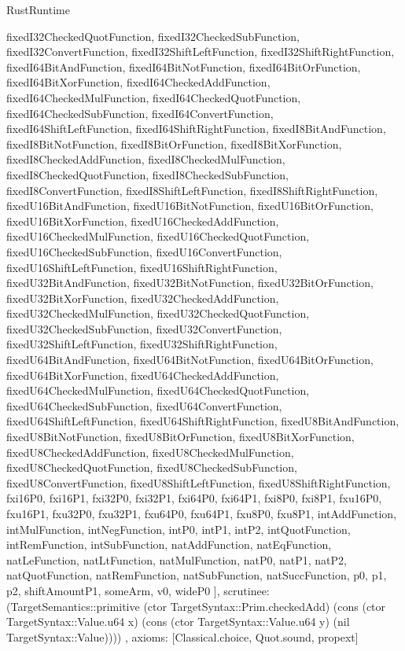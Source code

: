 \begin{lexlean}{RustRuntime}
\begin{semanticmodule}
{{      fixedI32CheckedQuotFunction,
      fixedI32CheckedSubFunction,
      fixedI32ConvertFunction,
      fixedI32ShiftLeftFunction,
      fixedI32ShiftRightFunction,
      fixedI64BitAndFunction,
      fixedI64BitNotFunction,
      fixedI64BitOrFunction,
      fixedI64BitXorFunction,
      fixedI64CheckedAddFunction,
      fixedI64CheckedMulFunction,
      fixedI64CheckedQuotFunction,
      fixedI64CheckedSubFunction,
      fixedI64ConvertFunction,
      fixedI64ShiftLeftFunction,
      fixedI64ShiftRightFunction,
      fixedI8BitAndFunction,
      fixedI8BitNotFunction,
      fixedI8BitOrFunction,
      fixedI8BitXorFunction,
      fixedI8CheckedAddFunction,
      fixedI8CheckedMulFunction,
      fixedI8CheckedQuotFunction,
      fixedI8CheckedSubFunction,
      fixedI8ConvertFunction,
      fixedI8ShiftLeftFunction,
      fixedI8ShiftRightFunction,
      fixedU16BitAndFunction,
      fixedU16BitNotFunction,
      fixedU16BitOrFunction,
      fixedU16BitXorFunction,
      fixedU16CheckedAddFunction,
      fixedU16CheckedMulFunction,
      fixedU16CheckedQuotFunction,
      fixedU16CheckedSubFunction,
      fixedU16ConvertFunction,
      fixedU16ShiftLeftFunction,
      fixedU16ShiftRightFunction,
      fixedU32BitAndFunction,
      fixedU32BitNotFunction,
      fixedU32BitOrFunction,
      fixedU32BitXorFunction,
      fixedU32CheckedAddFunction,
      fixedU32CheckedMulFunction,
      fixedU32CheckedQuotFunction,
      fixedU32CheckedSubFunction,
      fixedU32ConvertFunction,
      fixedU32ShiftLeftFunction,
      fixedU32ShiftRightFunction,
      fixedU64BitAndFunction,
      fixedU64BitNotFunction,
      fixedU64BitOrFunction,
      fixedU64BitXorFunction,
      fixedU64CheckedAddFunction,
      fixedU64CheckedMulFunction,
      fixedU64CheckedQuotFunction,
      fixedU64CheckedSubFunction,
      fixedU64ConvertFunction,
      fixedU64ShiftLeftFunction,
      fixedU64ShiftRightFunction,
      fixedU8BitAndFunction,
      fixedU8BitNotFunction,
      fixedU8BitOrFunction,
      fixedU8BitXorFunction,
      fixedU8CheckedAddFunction,
      fixedU8CheckedMulFunction,
      fixedU8CheckedQuotFunction,
      fixedU8CheckedSubFunction,
      fixedU8ConvertFunction,
      fixedU8ShiftLeftFunction,
      fixedU8ShiftRightFunction,
      fxi16P0,
      fxi16P1,
      fxi32P0,
      fxi32P1,
      fxi64P0,
      fxi64P1,
      fxi8P0,
      fxi8P1,
      fxu16P0,
      fxu16P1,
      fxu32P0,
      fxu32P1,
      fxu64P0,
      fxu64P1,
      fxu8P0,
      fxu8P1,
      intAddFunction,
      intMulFunction,
      intNegFunction,
      intP0,
      intP1,
      intP2,
      intQuotFunction,
      intRemFunction,
      intSubFunction,
      natAddFunction,
      natEqFunction,
      natLeFunction,
      natLtFunction,
      natMulFunction,
      natP0,
      natP1,
      natP2,
      natQuotFunction,
      natRemFunction,
      natSubFunction,
      natSuccFunction,
      p0,
      p1,
      p2,
      shiftAmountP1,
      someArm,
      v0,
      wideP0
    ],
    scrutinee: (TargetSemantics::primitive (ctor TargetSyntax::Prim.checkedAdd) (cons (ctor TargetSyntax::Value.u64 x) (cons (ctor TargetSyntax::Value.u64 y) (nil TargetSyntax::Value))))
  },
  axioms: [Classical.choice, Quot.sound, propext]
}


\end{semanticmodule}
\end{lexlean}
